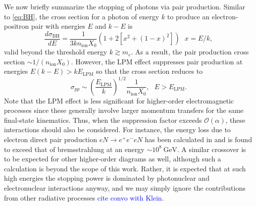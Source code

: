 \documentclass[twocolumn,showpacs,preprintnumbers,amsmath,amssymb,prd]{revtex4}
\newcommand{\OO}{\mathcal{O}}
\newcommand{\GeV}{\text{GeV}}
\def\r{\right)}
\def\l{\left(}
\begin{document}
\begin{appendices}
We now briefly summarize the stopping of photons via pair production. Similar to \eqref{eq:BH}, the cross section for a photon of energy $k$ to produce an electron-positron pair with energies $E$ and $k-E$ is
\begin{equation}
\label{eq:PP}
\frac{d \sigma_\text{BH}}{dE} = \frac{1}{3 k n_\text{ion} X_0} (1+ 2[x^2+ (1-x)^2]) ~~~ x = E/k,
\end{equation}
valid beyond the threshold energy $k \gtrsim m_e$. 
As a result, the pair production cross section $\sim 1/(n_\text{ion} X_0)$.
However, the LPM effect suppresses pair production at energies $E(k-E) > k E_\text{LPM}$ so that the cross section reduces to
\begin{equation}
\sigma_{pp} \sim \l\frac{E_\text{LPM}}{k} \r^{1/2} \frac{1}{n_\text{ion} X_0}, ~~~ E>E_\text{LPM}.
\end{equation}
Note that the LPM effect is less significant for higher-order electromagnetic processes since these generally involve larger momentum transfers for the same final-state kinematics.
Thus, when the suppression factor exceeds $\OO(\alpha)$, these interactions should also be considered.
For instance, the energy loss due to electron direct pair production $eN \to e^+ e^- e N$ has been calculated in \cite{Gerhardt:2010bj} and is found to exceed that of bremsstrahlung at an energy $\sim 10^{8} ~\GeV$. 
A similar crossover is to be expected for other higher-order diagrams as well, although such a calculation is beyond the scope of this work. 
Rather, it is expected that at such high energies the stopping power is dominated by photonuclear and electronuclear interactions anyway, and we may simply ignore the contributions from other radiative processes \textcolor{blue}{cite convo with Klein}. 


\end{appendices}
\end{document}
